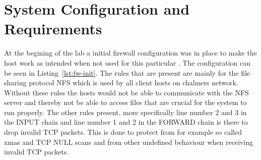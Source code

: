 \section{System Configuration and Requirements}
\label{sec:setup}




At the begining of the lab a initial firewall configuration was in place to make the host work as intended when not used for this particular \lab. The configuration can be seen in Listing~\ref{lst:fw-init}. The rules that are present are mainly for the file sharing protocol NFS which is used by all client hosts on chalmers network. Without these rules the hosts would not be able to communicate with the NFS server and thereby not be able to access files that are crucial for the system to run properly. The other rules present, more specifically line number 2 and 3 in the INPUT chain and line number 1 and 2 in the FORWARD chain is there to drop invalid TCP packets. This is done to protect from for example so called xmas and TCP NULL scans and from other undefined behaviour when receiving invalid TCP packets.   



